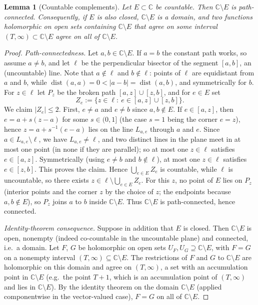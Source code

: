 \documentclass[11pt]{article}
\newtheorem{lemma}[theorem]{Lemma}
\theoremstyle{definition}
\theoremstyle{remark}
\theoremstyle{plain}
\newcommand{\C}{\mathbb{C}}
\newcommand{\dist}{\operatorname{dist}}
\begin{document}
\begin{lemma}[Countable complements]\label{lem:connect}
Let $E\subset\C$ be countable.  Then $\C\setminus E$ is path-connected.  Consequently, if
$E$ is also closed, $\C\setminus E$ is a domain, and two functions holomorphic on open
sets containing $\C\setminus E$ that agree on some interval
$(T,\infty)\subset\C\setminus E$ agree on all of $\C\setminus E$.
\end{lemma}

\begin{proof}
\emph{Path-connectedness.}  Let $a,b\in\C\setminus E$.  If $a=b$ the constant path works,
so assume $a\neq b$, and let $\ell$ be the perpendicular bisector of the segment $[a,b]$,
an (uncountable) line.  Note that $a\notin\ell$ and $b\notin\ell$: points of $\ell$ are
equidistant from $a$ and $b$, while $\dist(a,a)=0<|a-b|=\dist(a,b)$, and symmetrically for
$b$.  For $z\in\ell$ let $P_z$ be the broken path $[a,z]\cup[z,b]$, and for $e\in E$ set
\[
Z_e:=\{z\in\ell:\ e\in[a,z]\cup[z,b]\}.
\]
We claim $|Z_e|\le2$.  First, $e\neq a$ and $e\neq b$ since $a,b\notin E$.  If
$e\in[a,z]$, then $e=a+s(z-a)$ for some $s\in(0,1]$ (the case $s=1$ being the corner
$e=z$), hence $z=a+s^{-1}(e-a)$ lies on the line $L_{a,e}$ through $a$ and $e$.  Since
$a\in L_{a,e}\setminus\ell$, we have $L_{a,e}\neq\ell$, and two distinct lines in the
plane meet in at most one point (in none if they are parallel); so at most one $z\in\ell$
satisfies $e\in[a,z]$.  Symmetrically (using $e\neq b$ and $b\notin\ell$), at most one
$z\in\ell$ satisfies $e\in[z,b]$.  This proves the claim.  Hence
$\bigcup_{e\in E}Z_e$ is countable, while $\ell$ is uncountable, so there exists
$z\in\ell\setminus\bigcup_{e\in E}Z_e$.  For this $z$, no point of $E$ lies on $P_z$
(interior points and the corner $z$ by the choice of $z$; the endpoints because
$a,b\notin E$), so $P_z$ joins $a$ to $b$ inside $\C\setminus E$.  Thus $\C\setminus E$ is
path-connected, hence connected.

\emph{Identity-theorem consequence.}  Suppose in addition that $E$ is closed.  Then
$\C\setminus E$ is open, nonempty (indeed co-countable in the uncountable plane) and
connected, i.e.\ a domain.  Let $F$, $G$ be holomorphic on open sets
$U_F,U_G\supseteq\C\setminus E$, with $F=G$ on a nonempty interval
$(T,\infty)\subseteq\C\setminus E$.  The restrictions of $F$ and $G$ to $\C\setminus E$
are holomorphic on this domain and agree on $(T,\infty)$, a set with an accumulation
point in $\C\setminus E$ (e.g.\ the point $T+1$, which is an accumulation point of
$(T,\infty)$ and lies in $\C\setminus E$).  By the identity theorem on the domain
$\C\setminus E$ (applied componentwise in the vector-valued case), $F=G$ on all of
$\C\setminus E$.
\end{proof}
\end{document}
